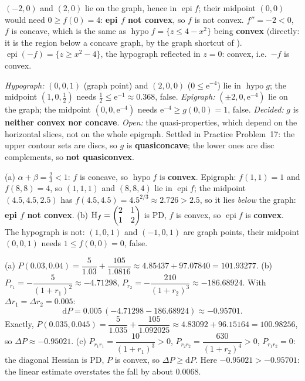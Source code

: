 \begin{solutions}
  \item $(-2,0)$ and $(2,0)$ lie on the graph, hence in
        $\operatorname{epi}f$; their midpoint $(0,0)$ would need
        $0\ge f(0)=4$: \textbf{epi $f$ not convex}, so $f$ is not convex.
        $f''=-2<0$, $f$ is concave, which is the same as
        $\operatorname{hypo}f=\{z\le4-x^{2}\}$ being \textbf{convex}
        (directly: it is the region below a concave graph, by the graph
        shortcut of ). $\operatorname{epi}(-f)=\{z\ge x^{2}-4\}$,
        the hypograph reflected in $z=0$: convex, i.e.\ $-f$ is convex.

  \item \emph{Hypograph:} $(0,0,1)$ (graph point) and $(2,0,0)$
        ($0\le\mathrm{e}^{-4}$) lie in $\operatorname{hypo}g$; the midpoint
        $(1,0,\tfrac12)$ needs $\tfrac12\le\mathrm{e}^{-1}\approx0.368$,
        false. \emph{Epigraph:} $(\pm2,0,\mathrm{e}^{-4})$ lie on the graph;
        the midpoint $(0,0,\mathrm{e}^{-4})$ needs
        $\mathrm{e}^{-4}\ge g(0,0)=1$, false. \emph{Decided:} $g$ is
        \textbf{neither convex nor concave}. \emph{Open:} the
        quasi-properties, which depend on the horizontal slices, not on the
        whole epigraph. Settled in Practice Problem~17: the upper contour
        sets are discs, so $g$ is \textbf{quasiconcave}; the lower ones are
        disc complements, so \textbf{not quasiconvex}.

  \item (a) $\alpha+\beta=\tfrac23<1$: $f$ is concave, so
        $\operatorname{hypo}f$ is \textbf{convex}. Epigraph: $f(1,1)=1$ and
        $f(8,8)=4$, so $(1,1,1)$ and $(8,8,4)$ lie in
        $\operatorname{epi}f$; the midpoint $(4.5,4.5,2.5)$ has
        $f(4.5,4.5)=4.5^{2/3}\approx2.726>2.5$, so it lies \emph{below} the
        graph: \textbf{epi $f$ not convex}.
        (b) $\operatorname{H}_f=\begin{pmatrix}2&1\\1&2\end{pmatrix}$ is PD, $f$ is
        convex, so $\operatorname{epi}f$ is \textbf{convex}. The hypograph
        is not: $(1,0,1)$ and $(-1,0,1)$ are graph points, their midpoint
        $(0,0,1)$ needs $1\le f(0,0)=0$, false.

  \item (a) $P(0.03,0.04)=\dfrac{5}{1.03}+\dfrac{105}{1.0816}
        \approx4.85437+97.07840=101.93277$.
        (b) $P_{r_1}=-\dfrac{5}{(1+r_1)^{2}}\approx-4.71298$,
        $P_{r_2}=-\dfrac{210}{(1+r_2)^{3}}\approx-186.68924$. With
        $\Delta r_1=\Delta r_2=0.005$:
        \[
          \mathrm{d}P=0.005\,(-4.71298-186.68924)\approx-0.95701 .
        \]
        Exactly, $P(0.035,0.045)=\dfrac{5}{1.035}+\dfrac{105}{1.092025}
        \approx4.83092+96.15164=100.98256$, so
        $\Delta P\approx-0.95021$.
        (c) $P_{r_1r_1}=\dfrac{10}{(1+r_1)^{3}}>0$,
        $P_{r_2r_2}=\dfrac{630}{(1+r_2)^{4}}>0$, $P_{r_1r_2}=0$: the
        diagonal Hessian is PD, $P$ is convex, so
        $\Delta P\ge\mathrm{d}P$. Here $-0.95021>-0.95701$: the linear
        estimate overstates the fall by about $0.0068$.


\end{solutions}
